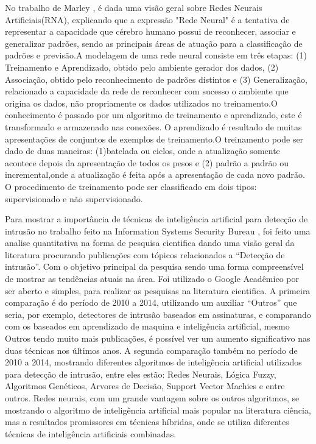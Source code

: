 No trabalho de Marley  \cite{Marley}, é dada uma visão geral sobre Redes Neurais Artificiais(RNA), explicando que a expressão "Rede Neural" é a tentativa de representar a capacidade que cérebro humano possui de reconhecer, associar e generalizar padrões, sendo as principais áreas de atuação para a classificação de padrões e previsão.A modelagem de uma rede neural consiste em três etapas: (1) Treinamento e Aprendizado, obtido pelo ambiente gerador dos dados, (2) Associação, obtido pelo reconhecimento de padrões distintos e (3) Generalização, relacionado a capacidade da rede de reconhecer com sucesso o ambiente que origina os dados, não propriamente os dados utilizados no treinamento.O conhecimento é passado por um algoritmo de treinamento e aprendizado, este é transformado e armazenado nas conexões. O aprendizado é resultado de muitas apresentações de conjuntos de exemplos de treinamento.O treinamento pode ser dado de duas maneiras: (1)batelada ou ciclos, onde a atualização somente acontece depois da apresentação de todos os pesos e (2) padrão a padrão ou incremental,onde a atualização é feita após a apresentação de cada novo padrão. O procedimento de treinamento pode ser classificado em dois tipos: supervisionado e não supervisionado.

Para mostrar a importância de técnicas de inteligência artificial para detecção de intrusão no trabalho feito na Information Systems Security Bureau \cite{Zhang}, foi feito uma analise quantitativa na forma de pesquisa cientifica dando uma visão geral da literatura procurando publicações com tópicos relacionados a “Detecção de intrusão”. 
Com o objetivo principal da pesquisa sendo uma forma compreensível de mostrar as tendências atuais na área. 
Foi utilizado o Google Acadêmico por ser aberto e simples, para realizar as pesquisas na literatura cientifica. 
A primeira comparação é  do período de 2010 a 2014, utilizando um auxiliar “Outros” que seria, por exemplo, detectores de intrusão baseados em assinaturas, e comparando com os baseados em aprendizado de maquina e inteligência artificial, mesmo Outros tendo muito mais publicações, é possível ver um aumento significativo nas duas técnicas nos últimos anos.
A segunda comparação também no período de 2010 a 2014, mostrando diferentes algoritmos de inteligência artificial utilizados para detecção de intrusão, entre eles estão: Redes Neurais, Lógica Fuzzy, Algoritmos Genéticos, Arvores de Decisão, Support Vector Machies e entre outros. 
Redes neurais, com um grande vantagem sobre os outros algoritmos, se mostrando o algoritmo de inteligência artificial mais popular na literatura ciência, mas a resultados promissores em técnicas híbridas, onde se utiliza diferentes técnicas de inteligência artificiais combinadas.

